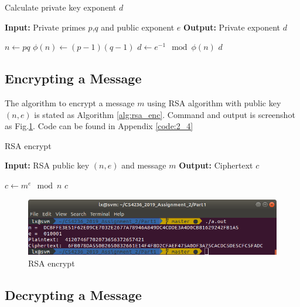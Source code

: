 \begin{algorithm}
\caption{Calculate private key exponent $d$}
\label{alg:rsa_pqe_d}
\begin{algorithmic}
\STATE \textbf{Input:} Private primes $p$,$q$ and public exponent $e$
\STATE \textbf{Output:} Private exponent $d$

\STATE $ n \gets pq $
\STATE $ \phi(n) \gets (p-1)(q-1) $
\STATE $ d \gets e^{-1} \mod{\phi(n)} $
\RETURN $ d $
\end{algorithmic}
\end{algorithm}

\subsection{Encrypting a Message}

The algorithm to encrypt a message $m$ using RSA algorithm with public key $(n, e) $ is stated as Algorithm \ref{alg:rsa_enc}.
Command and output is screenshot as Fig.\ref{fig:p2_4}.
Code can be found in Appendix \ref{code:2_4}

\begin{algorithm}
\caption{RSA encrypt}
\label{alg:rsa_enc}
\begin{algorithmic}
\STATE \textbf{Input:} RSA public key $(n, e)$ and message $m$
\STATE \textbf{Output:} Ciphertext $c$

\STATE $ c \gets m^e \mod{n} $
\RETURN $ c $
\end{algorithmic}
\end{algorithm}

\begin{figure}[b!]
\centering
\includegraphics[width=\columnwidth]{pictures/p2_4.png}
\caption{
    RSA encrypt
}
\label{fig:p2_4}
\end{figure}

\subsection{Decrypting a Message}

